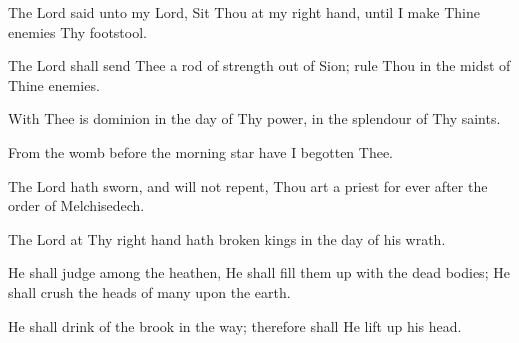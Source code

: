 The Lord said unto my Lord, Sit Thou at my right hand, until I make Thine enemies Thy footstool.

The Lord shall send Thee a rod of strength out of Sion; rule Thou in the midst of Thine enemies.

With Thee is dominion in the day of Thy power, in the splendour of Thy saints.

From the womb before the morning star have I begotten Thee.

The Lord hath sworn, and will not repent, Thou art a priest for ever after the order of Melchisedech.

The Lord at Thy right hand hath broken kings in the day of his wrath.

He shall judge among the heathen, He shall fill them up with the dead bodies; He shall crush the heads of many upon the earth.

He shall drink of the brook in the way; therefore shall He lift up his head.
